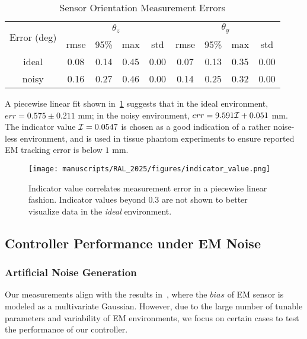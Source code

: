 \begin{table}[]
\centering
\caption{Sensor Orientation Measurement Errors}
\label{tab:chap-5-sensor-ori-errors}
\begin{tabular}{c|cccc|cccc}
\toprule
\multirow{2}{*}{Error (deg)} & \multicolumn{4}{c|}{$\theta_z$} & \multicolumn{4}{c}{$\theta_y$} \\
                            & rmse  & 95\%  & max   & std    & rmse  & 95\%  & max   & std    \\ \hline
ideal                       & 0.08  & 0.14  & 0.45  & 0.00   & 0.07  & 0.13  & 0.35  & 0.00   \\
noisy                       & 0.16  & 0.27  & 0.46  & 0.00   & 0.14  & 0.25  & 0.32  & 0.00   \\
\bottomrule
\end{tabular}
\par\smallskip
\end{table}

A piecewise linear fit shown in~\cref{fig:chap-5-indicator-value} suggests that in the ideal environment, $err = 0.575\pm 0.211$ mm; in the noisy environment, $err = 9.591\mathcal{I} + 0.051$ mm. The indicator value $\mathcal{I} = 0.0547$ is chosen as a good indication of a rather noise-less environment, and is used in tissue phantom experiments to ensure reported EM tracking error is below $1$ mm.

\begin{figure}[h]
  \centering
  \texttt{[image: manuscripts/RAL\_2025/figures/indicator\_value.png]}
  \caption{Indicator value correlates measurement error in a piecewise linear fashion. Indicator values beyond 0.3 are not shown to better visualize data in the \textit{ideal} environment.}
  \label{fig:chap-5-indicator-value}
\end{figure}


\subsection{Controller Performance under EM Noise}
\label{sec:chap-5-controller-performance-em-noise}

\subsubsection{Artificial Noise Generation}
\label{sec:chap-5-artificial-noise}

Our measurements align with the results in~\parencite{sadjadiSimultaneousElectromagneticTracking2016}, where the $bias$ of EM sensor is modeled as a multivariate Gaussian. However, due to the large number of tunable parameters and variability of EM environments, we focus on certain cases to test the performance of our controller.

